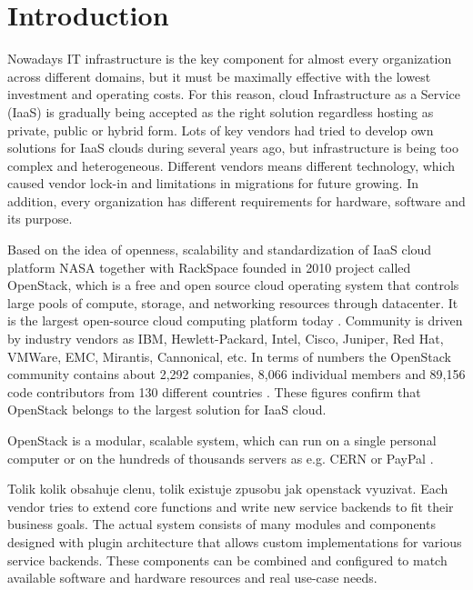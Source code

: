 
\section{Introduction}


Nowadays IT infrastructure is the key component for almost every organization across different domains, but it must be maximally effective with the lowest investment and operating costs.
For this reason, cloud Infrastructure as a Service (IaaS) is gradually being accepted as the right solution regardless hosting as private, public or hybrid form. Lots of key vendors had tried to develop own solutions for IaaS clouds during several years ago,
but infrastructure is being too complex and heterogeneous. Different vendors means different technology, which caused vendor lock-in and limitations in migrations for future growing. In addition, every organization has different requirements for hardware, software and its purpose. 

Based on the idea of openness, scalability and standardization of IaaS cloud platform NASA together with RackSpace founded in 2010 project called OpenStack, which is a free and open source cloud operating system that controls large pools of compute, storage, and networking resources through
datacenter. It is the largest open-source cloud computing platform today \cite{OpenStack}. Community is driven by industry vendors as IBM, Hewlett-Packard, Intel, Cisco, Juniper, Red Hat, VMWare, EMC, Mirantis, Cannonical, etc. In terms of numbers the OpenStack community contains about 2,292 companies, 8,066 individual members and 89,156 code contributors from 130 different countries \cite{STACKALYTICS}.
These figures confirm that OpenStack belongs to the largest solution for IaaS cloud.

OpenStack is a modular, scalable system, which can run on a single personal computer or on the hundreds of thousands servers as e.g. CERN \cite{CERN} or PayPal \cite{PayPal}.

Tolik kolik obsahuje clenu, tolik existuje zpusobu jak openstack vyuzivat.
Each vendor tries to extend core functions and write new service backends to fit their business goals. The actual system consists of many modules and components designed with plugin architecture that allows custom implementations for various service backends. These components can be combined and configured to match available software and hardware resources and real use-case needs.

